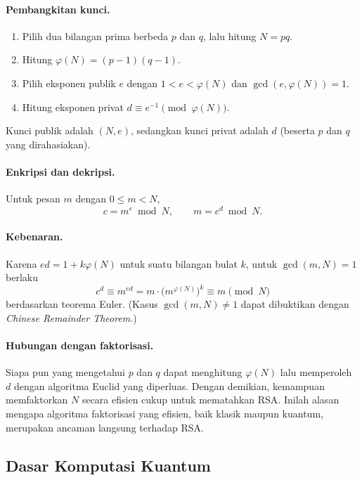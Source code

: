 \documentclass[11pt,a4paper]{article}
\begin{document}
\paragraph{Pembangkitan kunci.}
\begin{enumerate}[label=\arabic*.]
  \item Pilih dua bilangan prima berbeda $p$ dan $q$, lalu hitung $N = pq$.
  \item Hitung $\varphi(N) = (p-1)(q-1)$.
  \item Pilih eksponen publik $e$ dengan $1 < e < \varphi(N)$ dan
        $\gcd(e, \varphi(N)) = 1$.
  \item Hitung eksponen privat $d \equiv e^{-1} \pmod{\varphi(N)}$.
\end{enumerate}
Kunci publik adalah $(N, e)$, sedangkan kunci privat adalah $d$
(beserta $p$ dan $q$ yang dirahasiakan).

\paragraph{Enkripsi dan dekripsi.}
Untuk pesan $m$ dengan $0 \le m < N$,
\begin{equation}
  c = m^e \bmod N, \qquad m = c^d \bmod N.
\end{equation}

\paragraph{Kebenaran.}
Karena $ed = 1 + k\varphi(N)$ untuk suatu bilangan bulat $k$, untuk
$\gcd(m, N) = 1$ berlaku
\begin{equation}
  c^d \equiv m^{ed} = m \cdot \big(m^{\varphi(N)}\big)^k \equiv m \pmod N
\end{equation}
berdasarkan teorema Euler. (Kasus $\gcd(m, N) \ne 1$ dapat dibuktikan dengan
\emph{Chinese Remainder Theorem}.)

\paragraph{Hubungan dengan faktorisasi.}
Siapa pun yang mengetahui $p$ dan $q$ dapat menghitung $\varphi(N)$ lalu
memperoleh $d$ dengan algoritma Euclid yang diperluas. Dengan demikian,
kemampuan memfaktorkan $N$ secara efisien cukup untuk mematahkan RSA. Inilah
alasan mengapa algoritma faktorisasi yang efisien, baik klasik maupun kuantum,
merupakan ancaman langsung terhadap RSA.

\subsection{Dasar Komputasi Kuantum}
\end{document}
